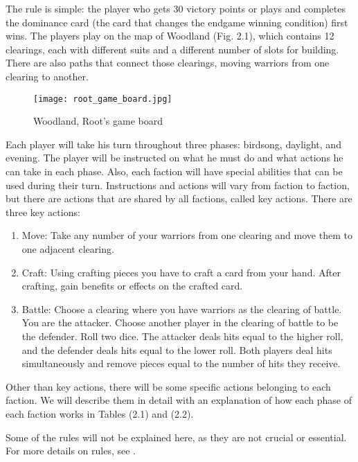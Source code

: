 The rule is simple: the player who gets 30 victory points or plays and completes the dominance card (the card that changes the endgame winning condition) first wins. The players play on the map of Woodland (Fig. 2.1), which contains 12 clearings, each with different suits and a different number of slots for building. There are also paths that connect those clearings, moving warriors from one clearing to another.

\begin{figure}
  \begin{center}
    \texttt{[image: root\_game\_board.jpg]}
  \end{center}
  \caption{Woodland, Root's game board}
  \label{fig:root-game-board}
\end{figure}

Each player will take his turn throughout three phases: birdsong, daylight, and evening. The player will be instructed on what he must do and what actions he can take in each phase. Also, each faction will have special abilities that can be used during their turn. Instructions and actions will vary from faction to faction, but there are actions that are shared by all factions, called key actions. There are three key actions:

\begin{enumerate}
  \item Move: Take any number of your warriors from one clearing and move them to one adjacent clearing.
  \item Craft: Using crafting pieces you have to craft a card from your hand. After crafting, gain benefits or effects on the crafted card.
  \item Battle: Choose a clearing where you have warriors as the clearing of battle. You are the attacker. Choose another player in the clearing of battle to be the defender. Roll two dice. The attacker deals hits equal to the higher roll, and the defender deals hits equal to the lower roll. Both players deal hits simultaneously and remove pieces equal to the number of hits they receive.
\end{enumerate}

Other than key actions, there will be some specific actions belonging to each faction. We will describe them in detail with an explanation of how each phase of each faction works in Tables (2.1) and (2.2).

Some of the rules will not be explained here, as they are not crucial or essential. For more details on rules, see \cite{RootBoardGameRules}.

